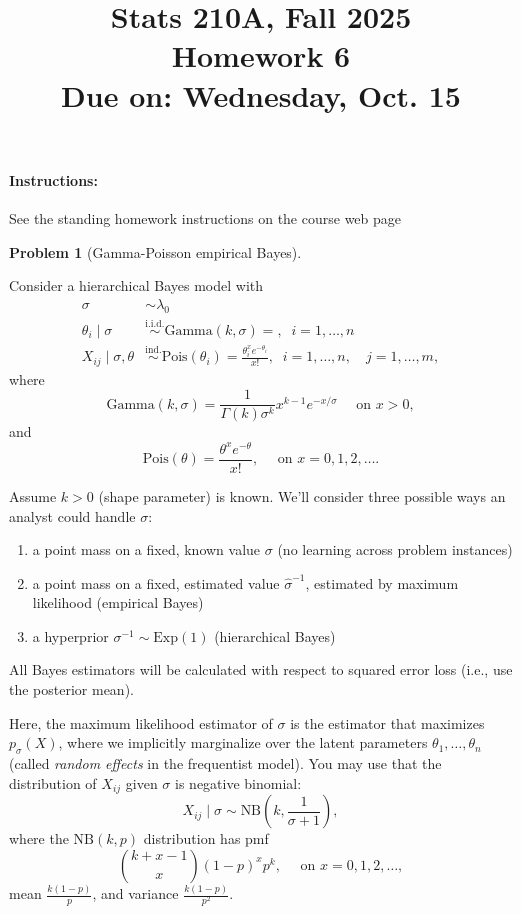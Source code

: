\documentclass{article}
\newcommand{\simiid}{\overset{\text{i.i.d.}}{\sim}}
\newcommand{\simind}{\overset{\text{ind.}}{\sim}}
\theoremstyle{definition}
\newtheorem{problem}{Problem}
\begin{document}
\title{Stats 210A, Fall 2025\\
  Homework 6 \\
  {\large {\bf Due on}: Wednesday, Oct. 15}}
\date{}

\maketitle

\paragraph{Instructions:} See the standing homework instructions on the course web page



\begin{problem}[Gamma-Poisson empirical Bayes]
\label{prob:gamma-poisson-bayes}

Consider a hierarchical Bayes model with 
\begin{align*}
  \sigma &\sim \lambda_0\\
  \theta_i \mid \sigma &\simiid \text{Gamma}(k,\sigma) = , \;\; i=1,\ldots,n\\
  X_{ij} \mid \sigma, \theta &\simind \text{Pois}(\theta_i) = \frac{\theta_i^{x}e^{-\theta_i}}{x!}, \;\; i=1,\ldots,n, \quad j = 1,\ldots,m,
\end{align*}
where
\[
\text{Gamma}(k,\sigma) = \frac{1}{\Gamma(k)\sigma^{k}} x^{k - 1}e^{-x/\sigma} \quad \text{ on } x>0,
\]
and
\[
\text{Pois}(\theta) = \frac{\theta^{x}e^{-\theta}}{x!}, \quad \text{ on } x=0,1,2,\ldots.
\]

Assume $k > 0$ (shape parameter) is known. We'll consider three possible ways an analyst could handle $\sigma$:
\begin{enumerate}[leftmargin=.5in, label=(\roman*),]
\item a point mass on a fixed, known value $\sigma$ (no learning across problem instances)
\item a point mass on a fixed, estimated value $\hat\sigma^{-1}$, estimated by maximum likelihood (empirical Bayes)
\item a hyperprior $\sigma^{-1} \sim \text{Exp}(1)$ (hierarchical Bayes)
\end{enumerate}
All Bayes estimators will be calculated with respect to squared error loss (i.e., use the posterior mean).

Here, the maximum likelihood estimator of $\sigma$ is the estimator that maximizes $p_\sigma(X)$, where we implicitly marginalize over the latent parameters $\theta_1,\ldots,\theta_n$ (called {\em random effects} in the frequentist model). You may use that the distribution of $X_{ij}$ given $\sigma$ is negative binomial:
\[
X_{ij} \mid \sigma \sim \text{NB}\left(k,\frac{1}{\sigma + 1}\right),
\]
where the $\text{NB}(k,p)$ distribution has pmf
\[
\binom{k+x-1}{x}(1-p)^xp^k, \quad \text{ on } x=0,1,2,\ldots,
\]
mean $\frac{k(1-p)}{p}$, and variance $\frac{k(1-p)}{p^2}$. 


\end{problem}
\end{document}
